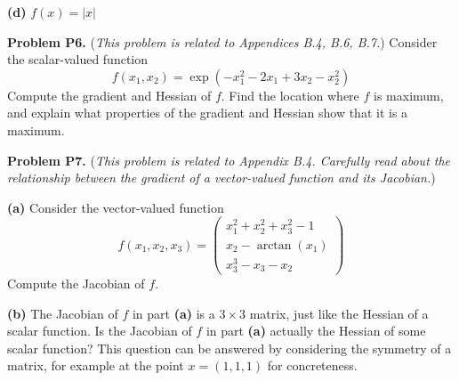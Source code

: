 \documentclass[12pt]{amsart}
\newcommand{\prob}[1]{\bigskip\noindent\textbf{#1}\quad }
\newcommand{\epart}[1]{\medskip\noindent\textbf{(#1)}\quad }
\begin{document}
\epart{d}  $f(x) = |x|$


\prob{Problem P6.}  (\emph{This problem is related to Appendices B.4, B.6, B.7.})  Consider the scalar-valued function
    $$f(x_1,x_2) = \exp(-x_1^2 - 2 x_1 + 3 x_2 - x_2^2)$$
Compute the gradient and Hessian of $f$.  Find the location where $f$ is maximum, and explain what properties of the gradient and Hessian show that it is a maximum.

\clearpage \newpage
\prob{Problem P7.}  (\emph{This problem is related to Appendix B.4.  Carefully read about the relationship between the gradient of a vector-valued function and its Jacobian.})

\epart{a}  Consider the vector-valued function
    $$f(x_1,x_2,x_3) = \begin{pmatrix}  x_1^2 + x_2^2 + x_3^2 - 1 \\
                                        x_2 - \arctan(x_1) \\
                                        x_3^3 - x_3 - x_2 \end{pmatrix}$$
Compute the Jacobian of $f$.

\epart{b}  The Jacobian of $f$ in part \textbf{(a)} is a $3 \times 3$ matrix, just like the Hessian of a scalar function.  Is the Jacobian of $f$ in part \textbf{(a)} actually the Hessian of some scalar function?  This question can be answered by considering the symmetry of a matrix, for example at the point $x=(1,1,1)$ for concreteness.
\end{document}
